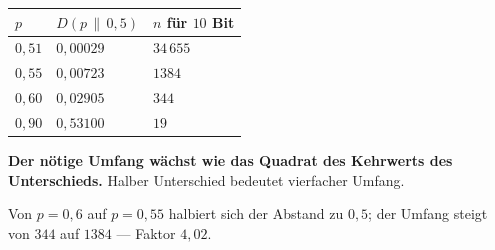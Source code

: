 \begin{merksatz}
\begin{center}
{\small
\renewcommand{\arraystretch}{1.48}
\begin{tabular}{@{}P{1.6cm}P{2.4cm}P{2.4cm}@{}}
\toprule
$p$ & $D(p\,\|\,0{,}5)$ & \textbf{$n$ für $10$ Bit}\\
\midrule
$0{,}51$ & $0{,}00029$ & $34\,655$\\
$0{,}55$ & $0{,}00723$ & $1384$\\
$0{,}60$ & $0{,}02905$ & $344$\\
$0{,}90$ & $0{,}53100$ & $19$\\
\bottomrule
\end{tabular}}
\end{center}

\begin{center}
\begin{minipage}{0.9\textwidth}
\textbf{Der nötige Umfang wächst wie das Quadrat des Kehrwerts des Unterschieds.} Halber Unterschied bedeutet vierfacher Umfang.
\end{minipage}
\end{center}

 Von $p=0{,}6$ auf $p=0{,}55$ halbiert sich der Abstand zu $0{,}5$; der Umfang steigt von $344$ auf $1384$ --- Faktor $4{,}02$. \checkmark

\begin{center}
\begin{minipage}{0.88\textwidth}
\end{minipage}
\end{center}
\end{merksatz}

